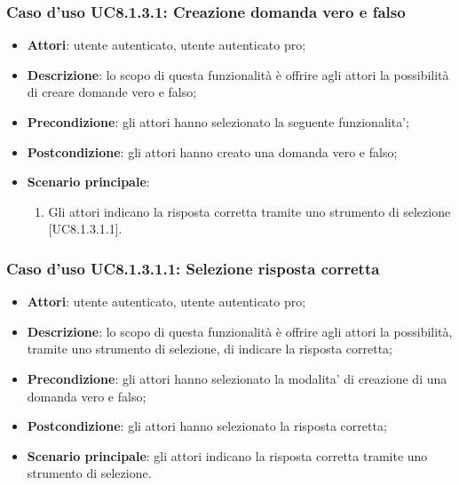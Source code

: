\subsubsection{Caso d'uso UC8.1.3.1: Creazione domanda vero e falso}
	\begin{itemize}
		\item
			\textbf{Attori}: utente autenticato, utente autenticato pro;
		\item		
			\textbf{Descrizione}: lo scopo di questa funzionalità è offrire agli attori la possibilità di creare domande vero e falso;
		\item
			\textbf{Precondizione}: gli attori hanno selezionato la seguente funzionalita'; 
		\item
			\textbf{Postcondizione}: gli attori hanno creato una domanda vero e falso;
		\item
			\textbf{Scenario principale}:
	       		\begin{enumerate}
					\item
					Gli attori indicano la risposta corretta tramite uno strumento di selezione [UC8.1.3.1.1].
	 			\end{enumerate}
	\end{itemize}

\subsubsection{Caso d'uso UC8.1.3.1.1: Selezione risposta corretta}
	\begin{itemize}
		\item
			\textbf{Attori}: utente autenticato, utente autenticato pro;
		\item		
			\textbf{Descrizione}: lo scopo di questa funzionalità è offrire agli attori la possibilità, tramite uno strumento di selezione, di indicare la risposta corretta;
		\item
			\textbf{Precondizione}: gli attori hanno selezionato la modalita' di creazione di una domanda vero e falso; 
		\item
			\textbf{Postcondizione}: gli attori hanno selezionato la risposta corretta;
		\item
			\textbf{Scenario principale}: gli attori indicano la risposta corretta tramite uno strumento di selezione. 
	 			
	\end{itemize}
	

	
